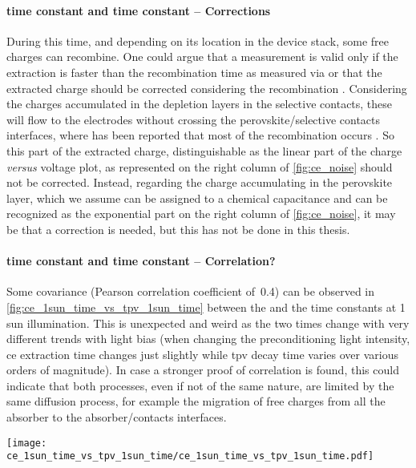 		\paragraph{ time constant and  time constant -- Corrections}
		During this time, and depending on its location in the device stack, some free charges can recombine.
		One could argue that a  measurement is valid only if the extraction is faster than the recombination time as measured via  \cite{Ryan2017a} or that the extracted charge should be corrected considering the recombination \cite{Credgington2011,Credgington2014}.
		Considering the charges accumulated in the depletion layers in the selective contacts, these will flow to the electrodes without crossing the perovskite/selective contacts interfaces, where has been reported that most of the recombination occurs \cite{Barnea-Nehoshtan2014,Stolterfoht2018a,Stolterfoht2018}.
		So this part of the extracted charge, distinguishable as the linear part of the charge \textsl{versus} voltage plot, as represented on the right column of \cref{fig:ce_noise} should not be corrected.
		Instead, regarding the charge accumulating in the perovskite layer, which we assume can be assigned to a chemical capacitance and can be recognized as the exponential part on the right column of \cref{fig:ce_noise}, it may be that a correction \cite{Shuttle2008a,Shuttle2008b} is needed, but this has not be done in this thesis.

		\paragraph{ time constant and  time constant -- Correlation?}
		Some covariance (Pearson correlation coefficient of~0.4) can be observed in \cref{fig:ce_1sun_time_vs_tpv_1sun_time} between the  and the  time constants at 1 sun illumination.
		This is unexpected and weird as the two times change with very different trends with light bias (when changing the preconditioning light intensity, \gls{ce} extraction time changes just slightly while \gls{tpv} decay time varies over various orders of magnitude).
		In case a stronger proof of correlation is found, this could indicate that both processes, even if not of the same nature, are limited by the same diffusion process, for example the migration of free charges from all the absorber to the absorber/contacts interfaces.

		\begin{SCfigure}%
			\centering
			\texttt{[image: ce\_1sun\_time\_vs\_tpv\_1sun\_time/ce\_1sun\_time\_vs\_tpv\_1sun\_time.pdf]}
			\label{fig:ce_1sun_time_vs_tpv_1sun_time}
		\end{SCfigure}

